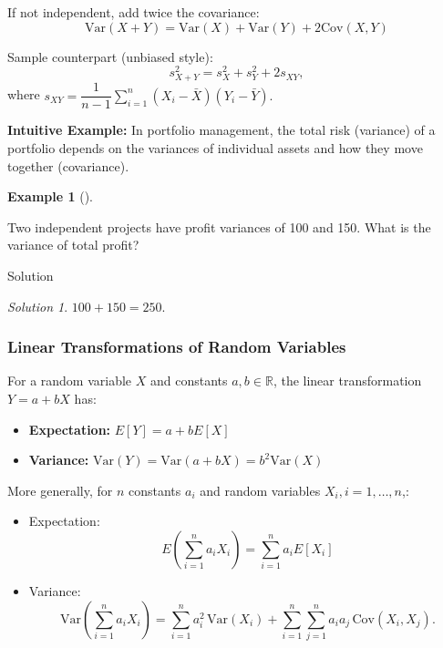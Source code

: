 \documentclass[
  12pt,
  letterpaper,
]{scrbook}
\providecommand{\tightlist}{%
  \setlength{\itemsep}{0pt}\setlength{\parskip}{0pt}}
\renewcommand{\tightlist}{\setlength{\itemsep}{0.5\baselineskip}\setlength{\parskip}{0.2\baselineskip}}
\theoremstyle{plain}
\theoremstyle{definition}
\newtheorem{example}{Example}[chapter]
\theoremstyle{remark}
\newtheorem{refsolution}{Solution}[chapter]
\begin{document}
If not independent, add twice the covariance:
\[\text{Var}(X + Y) = \text{Var}(X) + \text{Var}(Y) + 2\text{Cov}(X, Y)\]

Sample counterpart (unbiased style):
\[s_{X+Y}^2 = s_X^2 + s_Y^2 + 2 s_{XY},\] where
\(s_{XY} = \dfrac{1}{n-1}\sum_{i=1}^n (X_i-\bar{X})(Y_i-\bar{Y}).\)

\textbf{Intuitive Example:} In portfolio management, the total risk
(variance) of a portfolio depends on the variances of individual assets
and how they move together (covariance).

\begin{example}[]\protect\hypertarget{exm-6}{}\label{exm-6}

Two independent projects have profit variances of 100 and 150. What is
the variance of total profit?

\end{example}

Solution

\begin{refsolution}
\leavevmode

\(100 + 150 = 250\).

\label{sol-6}

\end{refsolution}

\subsubsection{Linear Transformations of Random
Variables}\label{linear-transformations-of-random-variables}

For a random variable \(X\) and constants \(a, b \in \mathbb{R}\), the
linear transformation \(Y = a + bX\) has:

\begin{itemize}
\tightlist
\item
  \textbf{Expectation:} \(E[Y] = a + bE[X]\)
\item
  \textbf{Variance:}
  \(\text{Var}(Y) = \text{Var}(a + bX) = b^2 \text{Var}(X)\)
\end{itemize}

More generally, for \(n\) constants \(a_i\) and random variables
\(X_i, i=1,\ldots,n\),:

\begin{itemize}
\item
  Expectation: \[
  E\left(\sum_{i=1}^n a_i X_i \right) = \sum_{i=1}^n a_i E[X_i]
  \]
\item
  Variance: \[
  \text{Var}\left(\sum_{i=1}^n a_i X_i \right) = \sum_{i=1}^n a_i^2 \, \text{Var}(X_i) + \sum_{i=1}^n \sum_{j=1}^n a_i a_j \, \text{Cov}(X_i, X_j).
  \]
\end{itemize}
\end{document}
